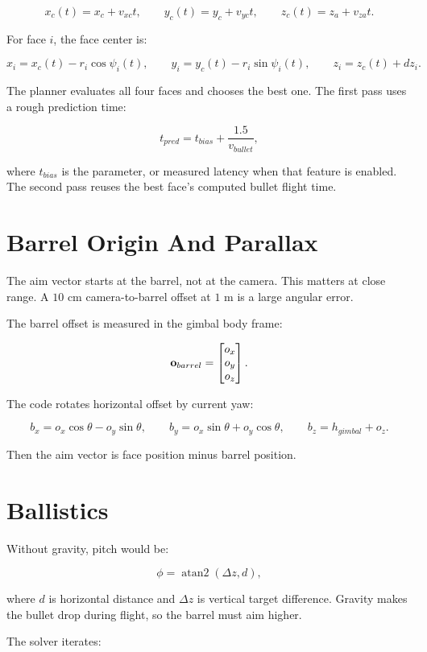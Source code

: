 \[
x_c(t) = x_c + v_{xc}t,\qquad
y_c(t) = y_c + v_{yc}t,\qquad
z_c(t) = z_a + v_{za}t.
\]

For face $i$, the face center is:

\[
x_i = x_c(t) - r_i\cos\psi_i(t),
\qquad
y_i = y_c(t) - r_i\sin\psi_i(t),
\qquad
z_i = z_c(t) + dz_i.
\]

The planner evaluates all four faces and chooses the best one. The first pass
uses a rough prediction time:

\[
t_{pred} = t_{bias} + \frac{1.5}{v_{bullet}},
\]

where $t_{bias}$ is the  parameter, or measured latency when
that feature is enabled. The second pass reuses the best face's computed
bullet flight time.

\section{Barrel Origin And Parallax}

The aim vector starts at the barrel, not at the camera. This matters at close
range. A $10$ cm camera-to-barrel offset at $1$ m is a large angular error.

The barrel offset is measured in the gimbal body frame:

\[
\mathbf{o}_{barrel} =
\begin{bmatrix}
o_x\\o_y\\o_z
\end{bmatrix}.
\]

The code rotates horizontal offset by current yaw:

\[
b_x = o_x\cos\theta - o_y\sin\theta,
\qquad
b_y = o_x\sin\theta + o_y\cos\theta,
\qquad
b_z = h_{gimbal} + o_z.
\]

Then the aim vector is face position minus barrel position.

\section{Ballistics}

Without gravity, pitch would be:

\[
\phi = \operatorname{atan2}(\Delta z, d),
\]

where $d$ is horizontal distance and $\Delta z$ is vertical target difference.
Gravity makes the bullet drop during flight, so the barrel must aim higher.

The solver iterates:

